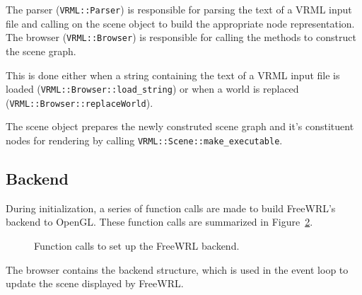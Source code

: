 \documentclass[12pt,letterpaper]{article}
\begin{document}
	\begin{figure}[!ht]
	    \centering
	    \caption{}\label{fig:sg-tree}
	\end{figure}

	The parser (\texttt{VRML::Parser}) is responsible for parsing the text
	of a VRML input file and calling on the scene object to build the
	appropriate node representation.
	The browser (\texttt{VRML::Browser}) is responsible for calling the
	methods to construct the scene graph.

	This is done either when a string containing the text of a VRML input
	file is loaded (\texttt{VRML::Browser::load\_string}) or when a world is
	replaced (\texttt{VRML::Browser::replaceWorld}).


	The scene object prepares the newly construted scene graph and it's
	constituent nodes for rendering by calling
	\texttt{VRML::Scene::make_executable}.

	\subsection{Backend}

	During initialization, a series of function calls are made to
	build FreeWRL's backend to OpenGL.
	These function calls are summarized in Figure~\ref{fig:be-setup}.

	\begin{figure}[!ht]
	    \centering
	    \caption{Function calls to set up the FreeWRL backend.}\label{fig:be-setup}
	\end{figure}

	The browser contains the backend structure, which is used in the event
	loop to update the scene displayed by FreeWRL.

	
	
\end{document}
